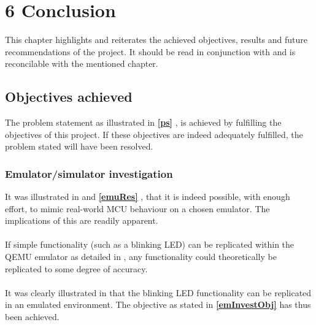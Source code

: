 

\chapter*{6 Conclusion}
\label{6conc}
\setcounter{chapter}{6}
\setcounter{section}{0}
\setcounter{figure}{0}
\setcounter{table}{0}

This chapter highlights and reiterates the achieved objectives, results and future recommendations of the project. It should be read in conjunction with \textbf{} and is reconcilable with the mentioned chapter.

\section{Objectives achieved}
The problem statement as illustrated in \textbf{\ref{ps} }, is achieved by fulfilling the objectives of this project. If these objectives are indeed adequately fulfilled, the problem stated will have been resolved.

\subsection{Emulator/simulator investigation}
It was illustrated in \textbf{} and \textbf{\ref{emuRes} }, that it is indeed possible, with enough effort, to mimic real-world MCU behaviour on a chosen emulator. The implications of this are readily apparent.
\\\\
If simple functionality (such as a blinking LED) can be replicated within the QEMU emulator as detailed in \textbf{}, any functionality could theoretically be replicated to some degree of accuracy. 
\\\\
It was clearly illustrated in \textbf{} that the blinking LED functionality can be replicated in an emulated environment. The objective as stated in \textbf{\ref{emInvestObj} } has thus been achieved.

